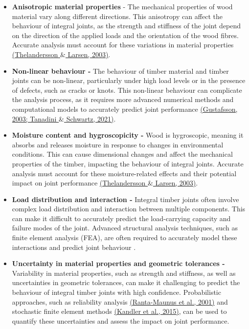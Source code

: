\begin{itemize}
	\item \textbf{Anisotropic material properties} - The mechanical properties of wood material vary along different directions. This anisotropy can affect the behaviour of integral joints, as the strength and stiffness of the joint depend on the direction of the applied loads and the orientation of the wood fibres. Accurate analysis must account for these variations in material properties \href{https://www.zotero.org/google-docs/?L0yiAX}{(Thelandersson $\&$ Larsen, 2003)}.

	\item \textbf{Non-linear behaviour - }The behaviour of timber material and timber joints can be non-linear, particularly under high load levels or in the presence of defects, such as cracks or knots. This non-linear behaviour can complicate the analysis process, as it requires more advanced numerical methods and computational models to accurately predict joint performance \href{https://www.zotero.org/google-docs/?BE40wh}{(Gustafsson, 2003; Tanadini $\&$ Schwartz, 2021)}.

	\item \textbf{Moisture content and hygroscopicity -} Wood is hygroscopic, meaning it absorbs and releases moisture in response to changes in environmental conditions. This can cause dimensional changes and affect the mechanical properties of the timber, impacting the behaviour of integral joints. Accurate analysis must account for these moisture-related effects and their potential impact on joint performance \href{https://www.zotero.org/google-docs/?6q9alE}{(Thelandersson $\&$ Larsen, 2003)}.

	\item \textbf{Load distribution and interaction -} Integral timber joints often involve complex load distribution and interaction between multiple components. This can make it difficult to accurately predict the load-carrying capacity and failure modes of the joint. Advanced structural analysis techniques, such as finite element analysis (FEA), are often required to accurately model these interactions and predict joint behaviour .

	\item \textbf{Uncertainty in material properties and geometric tolerances -} Variability in material properties, such as strength and stiffness, as well as uncertainties in geometric tolerances, can make it challenging to predict the behaviour of integral timber joints with high confidence. Probabilistic approaches, such as reliability analysis \href{https://www.zotero.org/google-docs/?Xd18TY}{(Ranta-Maunus et al., 2001)} and stochastic finite element methods \href{https://www.zotero.org/google-docs/?mnlFCb}{(Kandler et al., 2015)}, can be used to quantify these uncertainties and assess the impact on joint performance.

\end{itemize}
